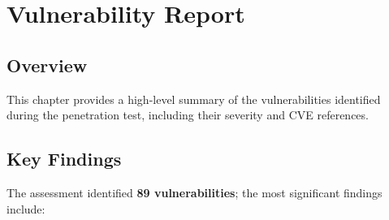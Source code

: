 \chapter{Vulnerability Report}

\section{Overview}

This chapter provides a high-level summary of the vulnerabilities identified during the penetration test, including their severity and CVE references. 

\section{Key Findings}

The assessment identified \textbf{89 vulnerabilities}; the most significant findings include:

